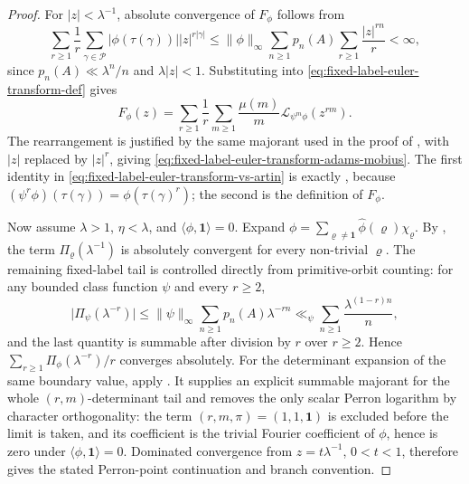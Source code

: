 \documentclass[11pt,a4paper]{amsart}
\theoremstyle{plain}
\theoremstyle{definition}
\theoremstyle{remark}
\newcommand{\cP}{\mathcal P}
\newcommand{\abs}[1]{\lvert #1 \rvert}
\newcommand{\norm}[1]{\lVert #1 \rVert}
\begin{document}
\begin{proof}
  For \(|z|<\lambda^{-1}\), absolute convergence of \(F_\phi\) follows
  from
  \[
    \sum_{r\ge1}\frac{1}{r}
      \sum_{\gamma\in\cP}\abs{\phi(\tau(\gamma))}|z|^{r|\gamma|}
    \le
    \norm{\phi}_\infty
    \sum_{n\ge1}p_n(A)\sum_{r\ge1}\frac{|z|^{rn}}{r}
    <\infty,
  \]
  since \(p_n(A)\ll\lambda^n/n\) and \(\lambda|z|<1\). Substituting
   into
  \eqref{eq:fixed-label-euler-transform-def} gives
  \[
    F_\phi(z)
    =
    \sum_{r\ge1}\frac{1}{r}
      \sum_{m\ge1}\frac{\mu(m)}{m}
        \mathcal L_{\psi^m\phi}(z^{rm}).
  \]
  The rearrangement is justified by the same majorant used in the proof
  of , with \(|z|\) replaced by
  \(|z|^r\), giving \eqref{eq:fixed-label-euler-transform-adams-mobius}.
  The first identity in
  \eqref{eq:fixed-label-euler-transform-vs-artin} is exactly
  , because
  \((\psi^r\phi)(\tau(\gamma))=\phi(\tau(\gamma)^r)\); the second is the
  definition of \(F_\phi\).

  Now assume \(\lambda>1\), \(\eta<\lambda\), and
  \(\langle\phi,\mathbf1\rangle=0\). Expand
  \(\phi=\sum_{\varrho\neq\mathbf1}\widehat\phi(\varrho)\chi_\varrho\).
  By , the term
  \(\Pi_\varrho(\lambda^{-1})\) is absolutely convergent for every
  non-trivial \(\varrho\).  The remaining fixed-label tail is controlled
  directly from primitive-orbit counting: for any bounded class function
  \(\psi\) and every \(r\ge2\),
  \[
    \abs{\Pi_\psi(\lambda^{-r})}
    \le
    \norm{\psi}_\infty\sum_{n\ge1}p_n(A)\lambda^{-rn}
    \ll_\psi
    \sum_{n\ge1}\frac{\lambda^{(1-r)n}}{n},
  \]
  and the last quantity is summable after division by \(r\) over
  \(r\ge2\). Hence \(\sum_{r\ge1}\Pi_\phi(\lambda^{-r})/r\) converges
  absolutely. For the determinant expansion of the same boundary value, apply
  . It supplies an explicit
  summable majorant for the whole \((r,m)\)-determinant tail and removes
  the only scalar Perron logarithm by character orthogonality: the term
  \((r,m,\pi)=(1,1,\mathbf1)\) is excluded before the limit is taken, and
  its coefficient is the trivial Fourier coefficient of \(\phi\), hence is
  zero under \(\langle\phi,\mathbf1\rangle=0\). Dominated
  convergence from \(z=t\lambda^{-1}\), \(0<t<1\), therefore gives the
  stated Perron-point continuation and branch convention.
\end{proof}
\end{document}
